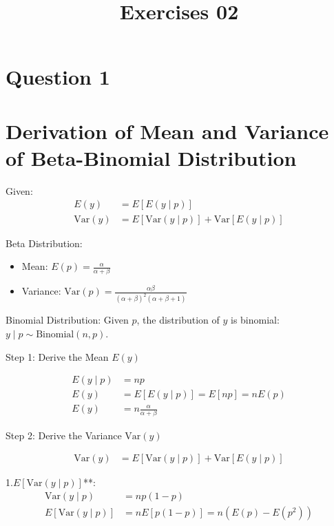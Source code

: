 \documentclass{article}
\title{Exercises 02}
\author{}
\date{}
\begin{document}
\maketitle

\section*{Question 1}

\section*{Derivation of Mean and Variance of Beta-Binomial Distribution}

Given:
\begin{align*}
E(y) &= E[E(y \mid p)] \\
\text{Var}(y) &= E[\text{Var}(y \mid p)] + \text{Var}[E(y \mid p)]
\end{align*}


Beta Distribution:
\begin{itemize}
    \item Mean: \( E(p) = \frac{\alpha}{\alpha + \beta} \)
    \item Variance: \( \text{Var}(p) = \frac{\alpha \beta}{(\alpha + \beta)^2 (\alpha + \beta + 1)} \)
\end{itemize}

Binomial Distribution:
Given \( p \), the distribution of \( y \) is binomial: \( y \mid p \sim \text{Binomial}(n, p) \).

Step 1: Derive the Mean \( E(y) \)

\begin{align*}
E(y \mid p) &= np \\
E(y) &= E[E(y \mid p)] = E[np] = n E(p) \\
E(y) &= n \frac{\alpha}{\alpha + \beta}
\end{align*}

Step 2: Derive the Variance \( \text{Var}(y) \)

\begin{align*}
\text{Var}(y) &= E[\text{Var}(y \mid p)] + \text{Var}[E(y \mid p)]
\end{align*}

1.\( E[\text{Var}(y \mid p)] \)**:
   \begin{align*}
   \text{Var}(y \mid p) &= np(1-p) \\
   E[\text{Var}(y \mid p)] &= n E[p(1-p)] = n \left( E(p) - E(p^2) \right)
   \end{align*}
\end{document}
